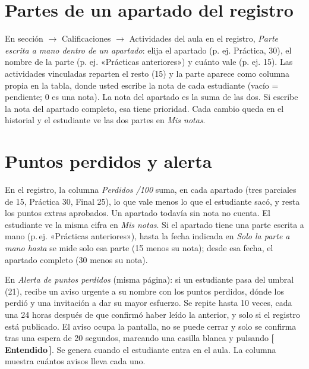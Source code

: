 \documentclass[11pt,a4paper,oneside]{book}
\newcommand{\boton}[1]{\textsf{\textbf{[\,#1\,]}}}
\newcommand{\ruta}[1]{\textsf{#1}}
\begin{document}
\section{Partes de un apartado del registro}
En \ruta{sección $\rightarrow$ Calificaciones $\rightarrow$ Actividades del aula en el registro}, \emph{Parte escrita a mano dentro de
un apartado}: elija el apartado (p. ej. Práctica, 30), el nombre de la parte (p. ej. «Prácticas anteriores») y cuánto vale (p. ej. 15).
Las actividades vinculadas reparten el resto (15) y la parte aparece como columna propia en la tabla, donde usted escribe la nota de
cada estudiante (vacío = pendiente; 0 es una nota). La nota del apartado es la suma de las dos. Si escribe la nota del apartado
completo, esa tiene prioridad. Cada cambio queda en el historial y el estudiante ve las dos partes en \emph{Mis notas}.

\section{Puntos perdidos y alerta}
En el registro, la columna \emph{Perdidos /100} suma, en cada apartado (tres parciales de 15, Práctica 30, Final 25), lo que vale menos
lo que el estudiante sacó, y resta los puntos extras aprobados. Un apartado todavía sin nota no cuenta. El estudiante ve la misma cifra en
\emph{Mis notas}. Si el apartado tiene una parte escrita a mano (p.\,ej. «Prácticas anteriores»), hasta la fecha indicada en
\emph{Solo la parte a mano hasta} se mide solo esa parte (15 menos su nota); desde esa fecha, el apartado completo (30 menos su nota).

En \emph{Alerta de puntos perdidos} (misma página): si un estudiante pasa del umbral (21), recibe un aviso urgente a su nombre con los
puntos perdidos, dónde los perdió y una invitación a dar su mayor esfuerzo. Se repite hasta 10 veces, cada una 24 horas después de que
confirmó haber leído la anterior, y solo si el registro está publicado. El aviso ocupa la pantalla, no se puede cerrar y solo se confirma
tras una espera de 20 segundos, marcando una casilla blanca y pulsando \boton{Entendido}. Se genera cuando el estudiante entra en el
aula. La columna muestra cuántos avisos lleva cada uno.
\end{document}
